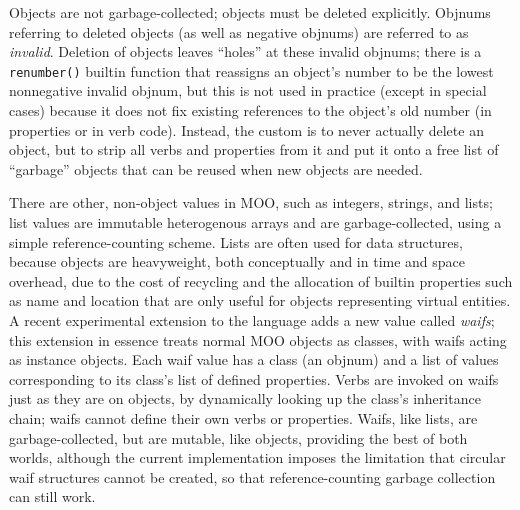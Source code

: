 \documentclass{article}
\begin{document}
Objects are not garbage-collected; objects must be deleted explicitly.
Objnums referring to deleted objects (as well as negative objnums) are
referred to as \emph{invalid}.  Deletion of objects leaves ``holes''
at these invalid objnums; there is a \texttt{renumber()} builtin
function that reassigns an object's number to be the lowest
nonnegative invalid objnum, but this is not used in practice (except
in special cases) because it does not fix existing references to the
object's old number (in properties or in verb code).  Instead, the
custom is to never actually delete an object, but to strip all verbs
and properties from it and put it onto a free list of ``garbage''
objects that can be reused when new objects are needed.

There are other, non-object values in MOO, such as integers, strings,
and lists; list values are immutable heterogenous arrays and are
garbage-collected, using a simple reference-counting scheme.  Lists
are often used for data structures, because objects are heavyweight,
both conceptually and in time and space overhead, due to the cost of
recycling and the allocation of builtin properties such as name and
location that are only useful for objects representing virtual
entities.  A recent experimental extension to the language adds a new
value called \emph{waifs}; this extension in essence treats normal
MOO objects as classes, with waifs acting as instance objects.  Each
waif value has a class (an objnum) and a list of values corresponding
to its class's list of defined properties.  Verbs are invoked on waifs
just as they are on objects, by dynamically looking up the class's
inheritance chain; waifs cannot define their own verbs or properties.
Waifs, like lists, are garbage-collected, but are mutable, like
objects, providing the best of both worlds, although the current
implementation imposes the limitation that circular waif structures
cannot be created, so that reference-counting garbage collection can
still work.
\end{document}
